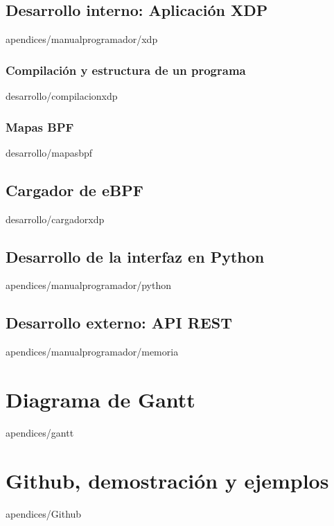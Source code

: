\documentclass[epsbased,copyright,final,printable,covers,extendedindex,firstnumbered,tfg,gnuplot]{tfgtfmthesisuam}
\begin{document}
    \section{Desarrollo interno: Aplicación XDP\label{SEC:ENTORNOC}}{apendices/manualprogramador/xdp}
    
       \subsection{Compilación y estructura de un programa\label{SEC:COMPILACIONXDP}}{desarrollo/compilacionxdp}
        \subsection{Mapas BPF\label{SEC:MAPASBPF}}{desarrollo/mapasbpf}
   \section{Cargador de eBPF\label{SEC:CARGADORXDP}}{desarrollo/cargadorxdp}
    
    
    
    \section{Desarrollo de la interfaz en Python\label{SEC:ENTORNOPYTHON}}{apendices/manualprogramador/python}
    \section{Desarrollo externo: API REST\label{SEC:ENTORNOPYTHON}}{apendices/manualprogramador/memoria}


\chapter{Diagrama de Gantt\label{CAP:GANTT}}{apendices/gantt}



\chapter{Github, demostración y ejemplos\label{CAP:Github}}{apendices/Github}
\end{document}
